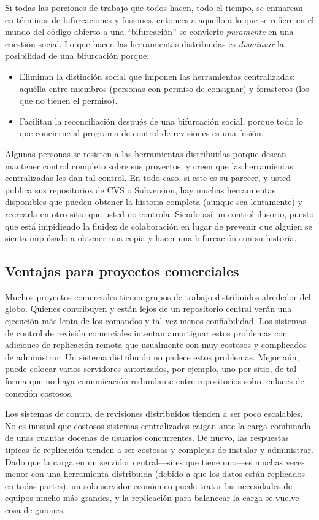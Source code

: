 Si todas las porciones de trabajo que todos hacen, todo el tiempo, se
enmarcan en términos de bifurcaciones y fusiones, entonces a aquello a
lo que se refiere en el mundo del código abierto a una ``bifurcación''
se convierte \emph{puramente} en una cuestión social. Lo que hacen las
herramientas distribuidas es \emph{disminuir} la posibilidad de una
bifurcación porque:
\begin{itemize}
\item Eliminan la distinción social que imponen las herramientas
  centralizadas: aquélla entre miembros (personas con permiso de
  consignar) y forasteros (los que no tienen el permiso).
\item Facilitan la reconciliación después de una bifurcación social,
  porque todo lo que concierne al programa de control de revisiones es
  una fusión.
\end{itemize}

Algunas personas se resisten a las herramientas distribuidas porque
desean mantener control completo sobre sus proyectos, y creen que las
herramientas centralizadas les dan tal control. En todo caso, si este
es su parecer, y usted publica sus repositorios de CVS o Subversion, hay
muchas herramientas disponibles que pueden obtener la historia
completa (aunque sea lentamente) y recrearla en otro sitio que usted no
controla. Siendo así un control ilusorio, puesto que está impidiendo
la fluidez de colaboración en lugar de prevenir que alguien se sienta
impulsado a obtener una copia y hacer una bifurcación con su historia.

\subsection{Ventajas para proyectos comerciales}

Muchos proyectos comerciales tienen grupos de trabajo distribuidos
alrededor del globo.  Quienes contribuyen y están lejos de un
repositorio central verán una ejecución más lenta de los comandos y tal
vez menos confiabilidad. Los sistemas de control de revisión
comerciales intentan amortiguar estos problemas con adiciones de
replicación remota que usualmente son muy costosos y complicados de
administrar. Un sistema distribuido no padece estos problemas. Mejor
aún, puede colocar varios servidores autorizados, por ejemplo, uno por
sitio, de tal forma que no haya comunicación redundante entre
repositorios sobre enlaces de conexión costosos.

Los sistemas de control de revisiones distribuidos tienden a ser poco
escalables. No es inusual que costosos sistemas centralizados caigan
ante la carga combinada de unas cuantas docenas de usuarios
concurrentes. De nuevo, las respuestas típicas de replicación tienden
a ser costosas y complejas de instalar y administrar. Dado que la
carga en un servidor central---si es que tiene uno---es muchas veces
menor con una herramienta distribuida (debido a que los datos están
replicados en todas partes), un solo servidor económico puede tratar
las necesidades de equipos mucho más grandes, y la replicación para
balancear la carga se vuelve cosa de guiones.

